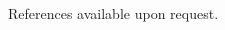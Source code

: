 \documentclass{res}
\newcommand{\resheading}[1]{{\normalsize \colorbox{mygrey}{\begin{minipage}{\textwidth}{\textbf{#1 \vphantom{p\^{E}}}}\end{minipage}}}}
\begin{document}
\begin{resume}
\begin{CJK*}{UTF8}{song}

References available upon request.

\end{CJK*}
\end{resume}
\end{document}
